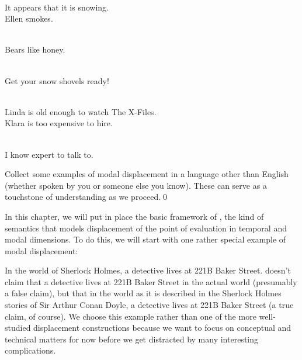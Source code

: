 \ex~ \\
It appears that it is snowing.\xe
%
%
\ex[aboveexskip=-15pt] \\
Ellen smokes. \xe

\ex~ \\
Bears like honey. \xe

\ex~ \\
Get your snow shovels ready! \xe

\enlargethispage{24pt}
\ex~ \\
Linda is old enough to watch The X-Files.\\
Klara is too expensive to hire. \xe

\ex~ \\
I know  expert to talk to. \xe

\begin{exercise}
  Collect some examples of modal displacement in a language other than English
  (whether spoken by you or someone else you know). These can serve as a
  touchstone of understanding as we proceed.\qed
\end{exercise}

In this chapter, we will put in place the basic framework of , the kind of semantics that models displacement of the point of
evaluation in temporal and modal dimensions. To do this, we will start with one
rather special example of modal displacement:

\ex\label{sherlock}%
In the world of Sherlock Holmes, a detective lives at 221B Baker Street.\xe
%
\Last doesn't claim that a detective lives at 221B Baker Street in the actual
world (presumably a false claim), but that in the world as it is described in
the Sherlock Holmes stories of Sir Arthur Conan Doyle, a detective lives at 221B
Baker Street (a true claim, of course). We choose this example rather than one
of the more well-studied displacement constructions because we want to focus
on conceptual and technical matters for now before we get distracted by many
interesting complications.

